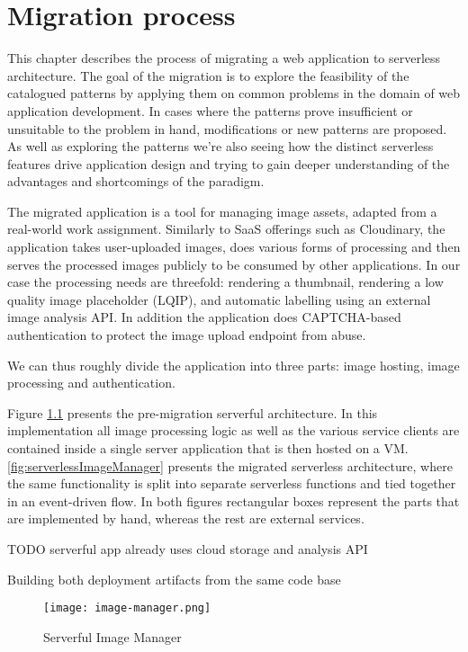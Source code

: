 \chapter{Migration process}

This chapter describes the process of migrating a web application to serverless architecture. The goal of the migration is to explore the feasibility of the catalogued patterns by applying them on common problems in the domain of web application development. In cases where the patterns prove insufficient or unsuitable to the problem in hand, modifications or new patterns are proposed. As well as exploring the patterns we're also seeing how the distinct serverless features drive application design and trying to gain deeper understanding of the advantages and shortcomings of the paradigm.

The migrated application is a tool for managing image assets, adapted from a real-world work assignment. Similarly to SaaS offerings such as Cloudinary, the application takes user-uploaded images, does various forms of processing and then serves the processed images publicly to be consumed by other applications. In our case the processing needs are threefold: rendering a thumbnail, rendering a low quality image placeholder (LQIP), and automatic labelling using an external image analysis API. In addition the application does CAPTCHA-based authentication to protect the image upload endpoint from abuse.

We can thus roughly divide the application into three parts: image hosting, image processing and authentication.

Figure \ref{fig:imageManager} presents the pre-migration serverful architecture. In this implementation all image processing logic as well as the various service clients are contained inside a single server application that is then hosted on a VM. \ref{fig:serverlessImageManager} presents the migrated serverless architecture, where the same functionality is split into separate serverless functions and tied together in an event-driven flow. In both figures rectangular boxes represent the parts that are implemented by hand, whereas the rest are external services.

TODO serverful app already uses cloud storage and analysis API

Building both deployment artifacts from the same code base

\begin{figure}[h]
  \centering
  \texttt{[image: image-manager.png]}
  \caption{Serverful Image Manager}
  \label{fig:imageManager}
\end{figure}

